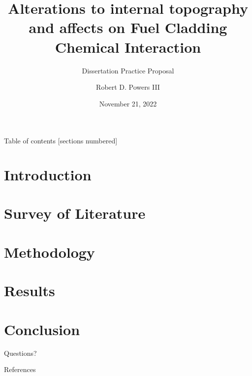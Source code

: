 \documentclass[10pt,aspectratio=1610]{beamer}
\title{Alterations to internal topography and affects on Fuel Cladding Chemical Interaction}
\subtitle{Dissertation Practice Proposal}
\date{November 21, 2022}
\author{Robert D. Powers III}
\institute{Oregon State University}
\begin{document}
\maketitle

\begin{frame}{Table of contents}
  [sections numbered]
  \tableofcontents[hideallsubsections]
\end{frame}


\section[Intro]{Introduction}

\section{Survey of Literature}

\section{Methodology}

\section{Results}

\section{Conclusion}


\begin{frame}[fragile]{Questions?}
  \begin{figure}
    \centering
    \scalebox{0.65}{}
  \end{figure}
\end{frame}


\appendix

			

\begin{frame}[allowframebreaks]{References}

  
  

\end{frame}
\end{document}
